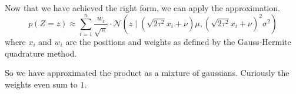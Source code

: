\documentclass[11pt]{article}
\begin{document}
Now that we have achieved the right form, we can apply the approximation.
\begin{equation*}
  p(Z = z) \approx \sum_{i = 1}^{n} \frac{w_{i}}{\sqrt{\pi}} \cdot \mathcal{N}\left( z \mid \left(\sqrt{2 \tau^{2}} x_{i} + \nu\right)\mu, \left(\sqrt{2 \tau^{2}} x_{i} + \nu\right)^{2}\sigma^{2} \right)
\end{equation*}
where $x_{i}$ and $w_{i}$ are the positions and weights as defined by the
Gauss-Hermite quadrature method.

So we have approximated the product as a mixture of gaussians. Curiously the
weights even sum to $1$.
\end{document}
